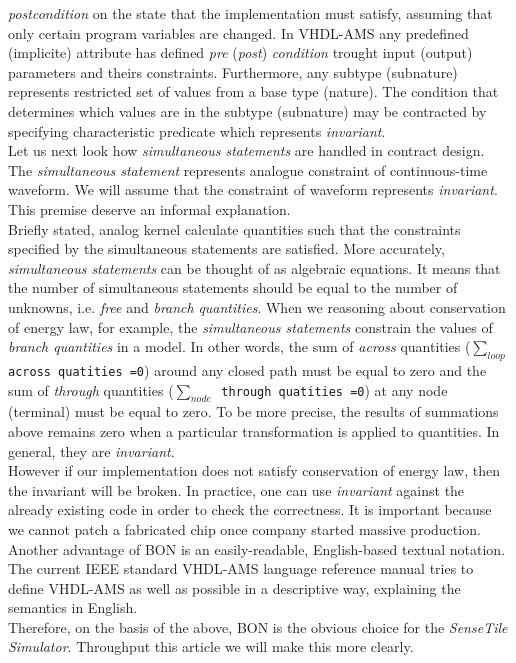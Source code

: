 \documentclass{article}
\newcommand{\STS}{\emph{SenseTile Simulator}\xspace}
\newcommand{\inv}{\emph{invariant}\xspace}
\newcommand{\arcoss}{\emph{across}\xspace}
\newcommand{\through}{\emph{through}\xspace}
\begin{document}
\emph{postcondition} on the state that the implementation must satisfy, assuming that
only certain program variables are changed.
In VHDL-AMS any predefined (implicite) attribute 
has defined \emph{pre} (\emph{post}) \emph{condition} trought input (output)
parameters and theirs constraints. Furthermore, any subtype (subnature)
represents restricted set of values from a base type (nature).
The condition that determines which values are in the subtype (subnature) 
may be contracted by specifying characteristic predicate which represents \inv.\\
Let us next look how \emph{simultaneous statements} are handled in contract design.
The \emph{simultaneous statement} represents analogue constraint of
continuous-time waveform. We will assume that the constraint of waveform
represents \inv. This premise deserve an informal explanation.\\
Briefly stated, analog kernel calculate quantities such
that the constraints specified by the simultaneous statements are satisfied.
More accurately, \emph{simultaneous statements} can be thought of as
algebraic equations. It means that the number of simultaneous statements
should be equal to the number of unknowns, i.e. \emph{free} and \emph{branch}
\emph{quantities}. When we reasoning about conservation of energy law, for example,
the \emph{simultaneous statements} constrain the values of \emph{branch quantities}
in a model.
In other words, the sum of \arcoss quantities (\texttt{$\sum_{loop}$ across quatities =0})
around any closed path must be equal to zero and the sum of \through
quantities (\texttt{$\sum_{node}$ through quatities =0}) at any node
(terminal) must be equal to zero. To be more precise, the results of summations 
above remains zero when a particular transformation is applied to quantities.
In general, they are \inv. \\
However if our implementation does not satisfy conservation of energy law, 
 then the invariant will be broken.
In practice, one can use \emph{invariant} against the already existing code in
order to check the correctness.
It is important because we cannot patch a fabricated chip once company started
massive production. \\
Another advantage of BON is an easily-readable, English-based textual notation.
The current IEEE standard VHDL-AMS language reference manual tries to define
VHDL-AMS as well as possible in a descriptive way, explaining the
semantics in English.\\
Therefore, on the basis of the above, BON is the obvious choice
for the \STS.
Throughput this article we will make this more clearly. 
\end{document}
